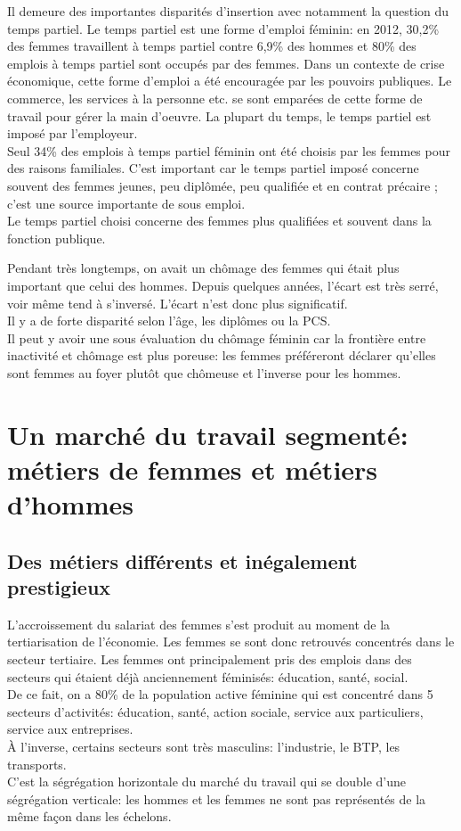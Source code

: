 \documentclass[12pt, a4paper, openany]{book}
\begin{document}
Il demeure des importantes disparités d'insertion avec notamment la question du temps partiel. Le temps partiel est une forme d'emploi féminin: en 2012, 30,2\% des femmes travaillent à temps partiel contre 6,9\% des hommes et 80\% des emplois à temps partiel sont occupés par des femmes. Dans un contexte de crise économique, cette forme d'emploi a été encouragée par les pouvoirs publiques. Le commerce, les services à la personne etc. se sont emparées de cette forme de travail pour gérer la main d'oeuvre. La plupart du temps, le temps partiel est imposé par l'employeur. \\
Seul 34\% des emplois à temps partiel féminin ont été choisis par les femmes pour des raisons familiales. C'est important car le temps partiel imposé concerne souvent des femmes jeunes, peu diplômée, peu qualifiée et en contrat précaire ; c'est une source importante de sous emploi. \\
Le temps partiel choisi concerne des femmes plus qualifiées et souvent dans la fonction publique. 


Pendant très longtemps, on avait un chômage des femmes qui était plus important que celui des hommes. Depuis quelques années, l'écart est très serré, voir même tend à s'inversé. L'écart n'est donc plus significatif. \\
Il y a de forte disparité selon l'âge, les diplômes ou la PCS. \\
Il peut y avoir une sous évaluation du chômage féminin car la frontière entre inactivité et chômage est plus poreuse: les femmes préféreront déclarer qu'elles sont femmes au foyer plutôt que chômeuse et l'inverse pour les hommes. 


\section{Un marché du travail segmenté: métiers de femmes et métiers d'hommes}

\subsection{Des métiers différents et inégalement prestigieux}

L'accroissement du salariat des femmes s'est produit au moment de la tertiarisation de l'économie. Les femmes se sont donc retrouvés concentrés dans le secteur tertiaire. Les femmes ont principalement pris des emplois dans des secteurs qui étaient déjà anciennement féminisés: éducation, santé, social. \\
De ce fait, on a 80\% de la population active féminine qui est concentré dans 5 secteurs d'activités: éducation, santé, action sociale, service aux particuliers, service aux entreprises. \\
À l'inverse, certains secteurs sont très masculins: l'industrie, le BTP, les transports. \\
C'est la ségrégation horizontale du marché du travail qui se double d'une ségrégation verticale: les hommes et les femmes ne sont pas représentés de la même façon dans les échelons.
\end{document}
